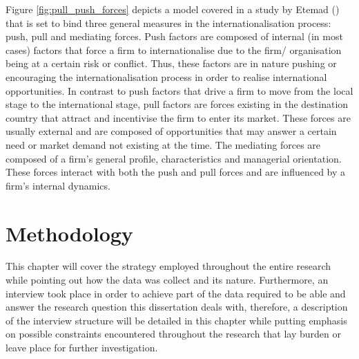 \documentclass[11pt,a4paper]{article}
\begin{document}
{{Figure \ref{fig:pull_push_forces} depicts a model covered in a study by Etemad (\citeyear{etemadInternationalizationSmallMediumsized2004}) that is set to bind three general measures in the internationalisation process: push, pull and mediating forces. Push factors are composed of internal (in most cases) factors that force a firm to internationalise due to the firm/ organisation being at a certain risk or conflict. Thus, these factors are in nature pushing or encouraging the internationalisation process in order to realise international opportunities. In contrast to push factors that drive a firm to move from the local stage to the international stage, pull factors are forces existing in the destination country that attract and incentivise the firm to enter its market. These forces are usually external and are composed of opportunities that may answer a certain need or market demand not existing at the time. The mediating forces are composed of a firm's general profile, characteristics and managerial orientation. These forces interact with both the push and pull forces and are influenced by a firm's internal dynamics.



\section{Methodology}
This chapter will cover the strategy employed throughout the entire research while pointing out how the data was collect and its nature. Furthermore, an interview took place in order to achieve part of the data required to be able and answer the research question this dissertation deals with, therefore, a description of the interview structure will be detailed in this chapter while putting emphasis on possible constraints encountered throughout the research that lay burden or leave place for further investigation. 

}}
\end{document}
